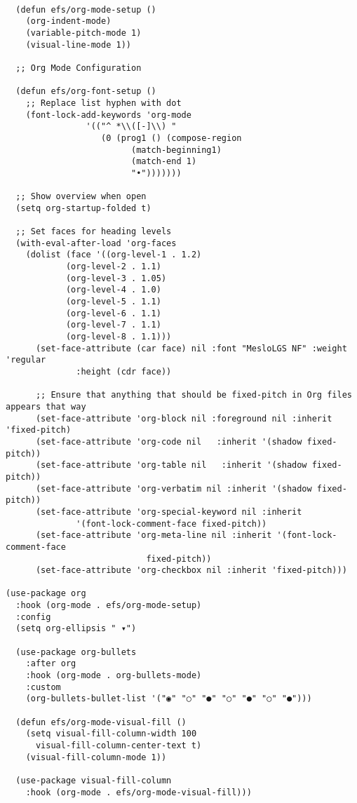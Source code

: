 \documentclass[11pt]{article}
\begin{document}
\begin{verbatim}

  (defun efs/org-mode-setup ()
    (org-indent-mode)
    (variable-pitch-mode 1)
    (visual-line-mode 1))

  ;; Org Mode Configuration  

  (defun efs/org-font-setup ()
    ;; Replace list hyphen with dot
    (font-lock-add-keywords 'org-mode
			    '(("^ *\\([-]\\) "
			       (0 (prog1 () (compose-region
					     (match-beginning1)
					     (match-end 1)
					     "•")))))))

  ;; Show overview when open
  (setq org-startup-folded t)

  ;; Set faces for heading levels
  (with-eval-after-load 'org-faces
    (dolist (face '((org-level-1 . 1.2)
		    (org-level-2 . 1.1)
		    (org-level-3 . 1.05)
		    (org-level-4 . 1.0)
		    (org-level-5 . 1.1)
		    (org-level-6 . 1.1)
		    (org-level-7 . 1.1)
		    (org-level-8 . 1.1)))
      (set-face-attribute (car face) nil :font "MesloLGS NF" :weight 'regular
			  :height (cdr face))

      ;; Ensure that anything that should be fixed-pitch in Org files appears that way
      (set-face-attribute 'org-block nil :foreground nil :inherit 'fixed-pitch)
      (set-face-attribute 'org-code nil   :inherit '(shadow fixed-pitch))
      (set-face-attribute 'org-table nil   :inherit '(shadow fixed-pitch))
      (set-face-attribute 'org-verbatim nil :inherit '(shadow fixed-pitch))
      (set-face-attribute 'org-special-keyword nil :inherit
			  '(font-lock-comment-face fixed-pitch))
      (set-face-attribute 'org-meta-line nil :inherit '(font-lock-comment-face
							fixed-pitch))
      (set-face-attribute 'org-checkbox nil :inherit 'fixed-pitch)))

(use-package org
  :hook (org-mode . efs/org-mode-setup)
  :config
  (setq org-ellipsis " ▾")

  (use-package org-bullets
    :after org
    :hook (org-mode . org-bullets-mode)
    :custom
    (org-bullets-bullet-list '("◉" "○" "●" "○" "●" "○" "●")))

  (defun efs/org-mode-visual-fill ()
    (setq visual-fill-column-width 100
	  visual-fill-column-center-text t)
    (visual-fill-column-mode 1))

  (use-package visual-fill-column
    :hook (org-mode . efs/org-mode-visual-fill)))
\end{verbatim}
\end{document}
